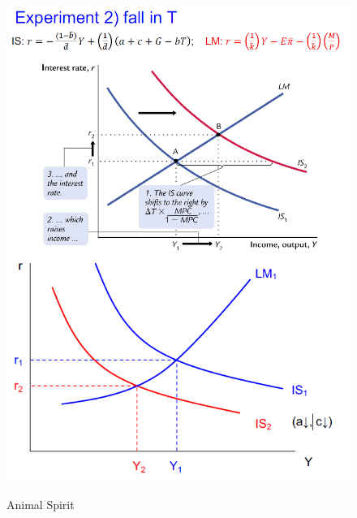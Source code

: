 \documentclass[UTF8, onecolumn, a4paper, 12pt]{article}
\begin{document}
\begin{center}
\begin{figure}[htb]
\begin{minipage}[b]{\linewidth}
{\begin{minipage}[b]{0.46\linewidth}
					\includegraphics[width=\linewidth]{faT}\vspace{8pt}
					\includegraphics[width=\linewidth]{animal}
					\caption{Animal Spirit}
				\end{minipage}
			}
		\end{minipage}
	\end{figure}
\end{center}
\end{document}
